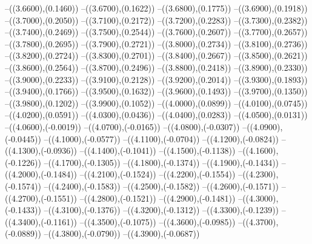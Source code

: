 {	--({\sx*(3.6600)},{\sy*(0.1460)})
	--({\sx*(3.6700)},{\sy*(0.1622)})
	--({\sx*(3.6800)},{\sy*(0.1775)})
	--({\sx*(3.6900)},{\sy*(0.1918)})
	--({\sx*(3.7000)},{\sy*(0.2050)})
	--({\sx*(3.7100)},{\sy*(0.2172)})
	--({\sx*(3.7200)},{\sy*(0.2283)})
	--({\sx*(3.7300)},{\sy*(0.2382)})
	--({\sx*(3.7400)},{\sy*(0.2469)})
	--({\sx*(3.7500)},{\sy*(0.2544)})
	--({\sx*(3.7600)},{\sy*(0.2607)})
	--({\sx*(3.7700)},{\sy*(0.2657)})
	--({\sx*(3.7800)},{\sy*(0.2695)})
	--({\sx*(3.7900)},{\sy*(0.2721)})
	--({\sx*(3.8000)},{\sy*(0.2734)})
	--({\sx*(3.8100)},{\sy*(0.2736)})
	--({\sx*(3.8200)},{\sy*(0.2724)})
	--({\sx*(3.8300)},{\sy*(0.2701)})
	--({\sx*(3.8400)},{\sy*(0.2667)})
	--({\sx*(3.8500)},{\sy*(0.2621)})
	--({\sx*(3.8600)},{\sy*(0.2564)})
	--({\sx*(3.8700)},{\sy*(0.2496)})
	--({\sx*(3.8800)},{\sy*(0.2418)})
	--({\sx*(3.8900)},{\sy*(0.2330)})
	--({\sx*(3.9000)},{\sy*(0.2233)})
	--({\sx*(3.9100)},{\sy*(0.2128)})
	--({\sx*(3.9200)},{\sy*(0.2014)})
	--({\sx*(3.9300)},{\sy*(0.1893)})
	--({\sx*(3.9400)},{\sy*(0.1766)})
	--({\sx*(3.9500)},{\sy*(0.1632)})
	--({\sx*(3.9600)},{\sy*(0.1493)})
	--({\sx*(3.9700)},{\sy*(0.1350)})
	--({\sx*(3.9800)},{\sy*(0.1202)})
	--({\sx*(3.9900)},{\sy*(0.1052)})
	--({\sx*(4.0000)},{\sy*(0.0899)})
	--({\sx*(4.0100)},{\sy*(0.0745)})
	--({\sx*(4.0200)},{\sy*(0.0591)})
	--({\sx*(4.0300)},{\sy*(0.0436)})
	--({\sx*(4.0400)},{\sy*(0.0283)})
	--({\sx*(4.0500)},{\sy*(0.0131)})
	--({\sx*(4.0600)},{\sy*(-0.0019)})
	--({\sx*(4.0700)},{\sy*(-0.0165)})
	--({\sx*(4.0800)},{\sy*(-0.0307)})
	--({\sx*(4.0900)},{\sy*(-0.0445)})
	--({\sx*(4.1000)},{\sy*(-0.0577)})
	--({\sx*(4.1100)},{\sy*(-0.0704)})
	--({\sx*(4.1200)},{\sy*(-0.0824)})
	--({\sx*(4.1300)},{\sy*(-0.0936)})
	--({\sx*(4.1400)},{\sy*(-0.1041)})
	--({\sx*(4.1500)},{\sy*(-0.1138)})
	--({\sx*(4.1600)},{\sy*(-0.1226)})
	--({\sx*(4.1700)},{\sy*(-0.1305)})
	--({\sx*(4.1800)},{\sy*(-0.1374)})
	--({\sx*(4.1900)},{\sy*(-0.1434)})
	--({\sx*(4.2000)},{\sy*(-0.1484)})
	--({\sx*(4.2100)},{\sy*(-0.1524)})
	--({\sx*(4.2200)},{\sy*(-0.1554)})
	--({\sx*(4.2300)},{\sy*(-0.1574)})
	--({\sx*(4.2400)},{\sy*(-0.1583)})
	--({\sx*(4.2500)},{\sy*(-0.1582)})
	--({\sx*(4.2600)},{\sy*(-0.1571)})
	--({\sx*(4.2700)},{\sy*(-0.1551)})
	--({\sx*(4.2800)},{\sy*(-0.1521)})
	--({\sx*(4.2900)},{\sy*(-0.1481)})
	--({\sx*(4.3000)},{\sy*(-0.1433)})
	--({\sx*(4.3100)},{\sy*(-0.1376)})
	--({\sx*(4.3200)},{\sy*(-0.1312)})
	--({\sx*(4.3300)},{\sy*(-0.1239)})
	--({\sx*(4.3400)},{\sy*(-0.1161)})
	--({\sx*(4.3500)},{\sy*(-0.1075)})
	--({\sx*(4.3600)},{\sy*(-0.0985)})
	--({\sx*(4.3700)},{\sy*(-0.0889)})
	--({\sx*(4.3800)},{\sy*(-0.0790)})
	--({\sx*(4.3900)},{\sy*(-0.0687)})
}
